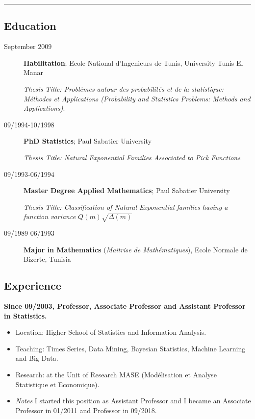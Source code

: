 \documentclass[]{article}
\begin{document}
\begin{center}\rule{0.5\linewidth}{\linethickness}\end{center}

\subsection{Education}\label{education}

\begin{description}
\item[September 2009]
\textbf{Habilitation}; Ecole National d'Ingenieurs de Tunis, University
Tunis El Manar

\emph{Thesis Title: Problèmes autour des probabilités et de la
statistique: Méthodes et Applications (Probability and Statistics
Problems: Methods and Applications)}.
\item[09/1994-10/1998]
\textbf{PhD Statistics}; Paul Sabatier University

\emph{Thesis Title: Natural Exponential Families Associated to Pick
Functions}
\item[09/1993-06/1994]
\textbf{Master Degree Applied Mathematics}; Paul Sabatier University

\emph{Thesis Title: Classification of Natural Exponential families
having a function variance \(Q(m)\sqrt{\Delta(m)}\)}
\item[09/1989-06/1993]
\textbf{Major in Mathematics} (\emph{Maitrise de Mathématiques}), Ecole
Normale de Bizerte, Tunisia
\end{description}

\subsection{Experience}\label{experience}

\textbf{Since 09/2003, Professor, Associate Professor and Assistant
Professor in Statistics.}

\begin{itemize}
\item
  Location: Higher School of Statistics and Information Analysis.
\item
  Teaching: Times Series, Data Mining, Bayesian Statistics, Machine
  Learning and Big Data.
\item
  Research: at the Unit of Research MASE (Modélisation et Analyse
  Statistique et Economique).
\item
  \emph{Notes} I started this position as Assistant Professor and I
  became an Associate Professor in 01/2011 and Professor in 09/2018.
\end{itemize}
\end{document}
